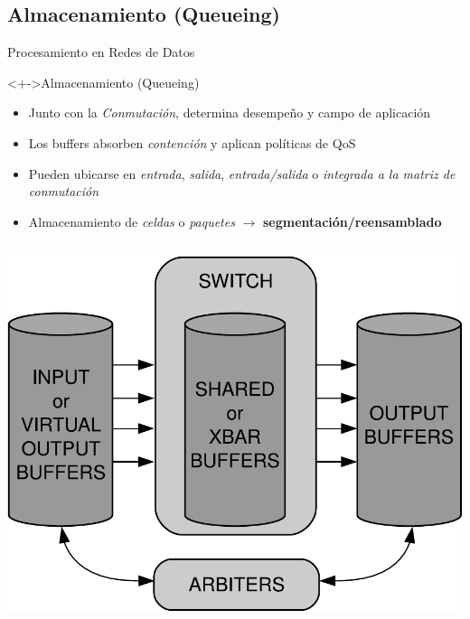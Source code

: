 \documentclass[xcolor=dvipsnames]{beamer}
\begin{document}
\subsection{Almacenamiento (Queueing)}
\begin{frame}{Procesamiento en Redes de Datos}
 
  \begin{block}<+->{Almacenamiento (Queueing)}  
    \begin{itemize}
      \scriptsize
      \item Junto con la \emph{Conmutación}, determina desempeño y campo de aplicación
      \item Los buffers absorben \emph{contención} y aplican políticas de QoS
      \item Pueden ubicarse en \emph{entrada}, \emph{salida}, \emph{entrada/salida} o \emph{integrada a la matriz de conmutación}
      \item Almacenamiento de \emph{celdas} o \emph{paquetes} $\rightarrow$ {\bf segmentación/reensamblado}
    \end{itemize}
  \end{block}
 
 	\begin{columns}
		\begin{column}{0.3\textwidth}
      \center
      \includegraphics[scale=0.23]{figures/queueing}
      \hskip1cm
    \end{column}
    

\end{columns}
\end{frame}
\end{document}
